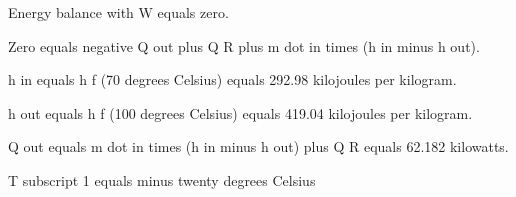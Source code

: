 Energy balance with W equals zero.

Zero equals negative Q out plus Q R plus m dot in times (h in minus h out).

h in equals h f (70 degrees Celsius) equals 292.98 kilojoules per kilogram.

h out equals h f (100 degrees Celsius) equals 419.04 kilojoules per kilogram.

Q out equals m dot in times (h in minus h out) plus Q R equals 62.182 kilowatts.

T subscript 1 equals minus twenty degrees Celsius